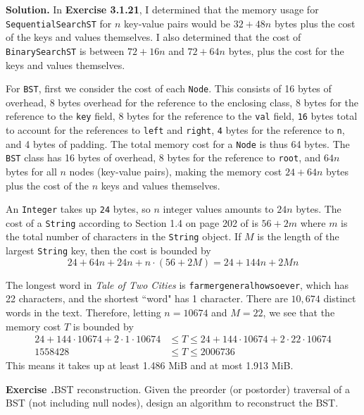 \documentclass[12pt, a4paper]{article}
\newenvironment{ex}[2][Exercise]
{\par\medskip\noindent \textbf{#1 #2.}}
{\medskip}
\newenvironment{sol}[1][Solution]
{\par\medskip\noindent \textbf{#1.} }
{\medskip}
\begin{document}
	\begin{sol}
		In \textbf{Exercise 3.1.21}, I determined that the memory usage for \texttt{SequentialSearchST}
		for $n$ key-value pairs would be $32+48n$ bytes plus the cost of the keys and values
		themselves. I also determined that the cost of \texttt{BinarySearchST} is between $72+16n$
		and $72+64n$ bytes, plus the cost for the keys and values themselves.
		
		For \texttt{BST}, first we consider the cost of each \texttt{Node}. This consists
		of 16 bytes of overhead, 8 bytes overhead for the reference to the enclosing class, 8
		bytes for the reference to the \texttt{key} field, 8 bytes for the reference
		to the \texttt{val} field, \texttt{16} bytes total to account for the references
		to \texttt{left} and \texttt{right}, \texttt{4} bytes for the reference to
		\texttt{n}, and 4 bytes of padding. The total memory cost for a \texttt{Node} is
		thus 64 bytes. The \texttt{BST} class has 16 bytes of overhead, 8 bytes for the
		reference to \texttt{root}, and $64n$ bytes for all $n$ nodes (key-value pairs),
		making the memory cost $24+64n$ bytes
		plus the cost of the $n$ keys and values themselves.
		
		An \texttt{Integer} takes up \texttt{24} bytes, so $n$ integer values amounts to
		$24n$ bytes. The cost of a \texttt{String} according to Section 1.4 on page
		202 of \cite{sedgewick_wayne} is $56+2m$ where $m$ is the total number of characters in
		the \texttt{String} object. If $M$ is the length of the largest \texttt{String}
		key, then the cost is bounded by
		\[
		24+64n+24n+n\cdot (56+2M)=24+144n+2Mn
		\]
		
		The longest word in \emph{Tale of Two Cities} is \texttt{farmergeneralhowsoever},
		which has 22 characters, and the shortest ``word" has 1 character. There are
		$10,674$ distinct words in the text. Therefore, letting $n=10674$ and $M=22$,
		we see that the memory cost $T$ is bounded by
		\begin{align*}
			24+144\cdot 10674+2\cdot 1\cdot 10674&\leq T\leq 24+144\cdot 10674+2\cdot 22\cdot 10674\\
			1558428& \leq T\leq 2006736
		\end{align*}
		This means it takes up at least 1.486 MiB and at most 1.913 MiB.
	\end{sol}
	\begin{ex}{30}
		\emph{BST reconstruction}. Given the preorder (or postorder) traversal of a BST
		(not including null nodes), design an algorithm to reconstruct the BST.
	\end{ex}
\end{document}
